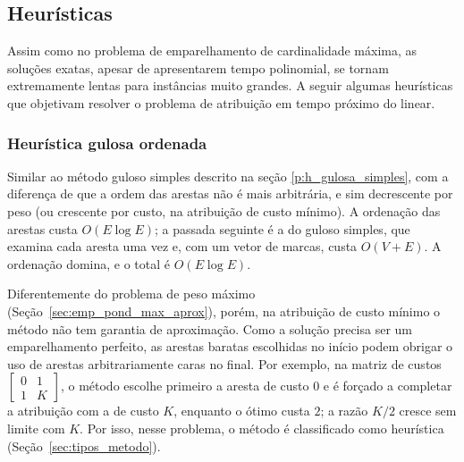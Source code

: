 \subsection{Heurísticas}

Assim como no problema de emparelhamento de cardinalidade máxima, as soluções exatas, apesar de apresentarem tempo polinomial, se tornam extremamente lentas para instâncias muito grandes. A seguir algumas heurísticas que objetivam resolver o problema de atribuição em tempo próximo do linear.

\subsubsection{Heurística gulosa ordenada}
\label{p:gulosa_ordenada}

Similar ao método guloso simples descrito na seção \ref{p:h_gulosa_simples}, com a diferença de que a ordem das arestas não é mais arbitrária, e sim decrescente por peso (ou crescente por custo, na atribuição de custo mínimo). A ordenação das arestas custa $O(E \log E)$; a passada seguinte é a do guloso simples, que examina cada aresta uma vez e, com um vetor de marcas, custa $O(V + E)$. A ordenação domina, e o total é $O(E \log E)$.

Diferentemente do problema de peso máximo (Seção~\ref{sec:emp_pond_max_aprox}), porém, na atribuição de custo mínimo o método não tem garantia de aproximação. Como a solução precisa ser um emparelhamento perfeito, as arestas baratas escolhidas no início podem obrigar o uso de arestas arbitrariamente caras no final. Por exemplo, na matriz de custos $\begin{bmatrix} 0 & 1 \\ 1 & K \end{bmatrix}$, o método escolhe primeiro a aresta de custo $0$ e é forçado a completar a atribuição com a de custo $K$, enquanto o ótimo custa $2$; a razão $K/2$ cresce sem limite com $K$. Por isso, nesse problema, o método é classificado como heurística (Seção~\ref{sec:tipos_metodo}).



